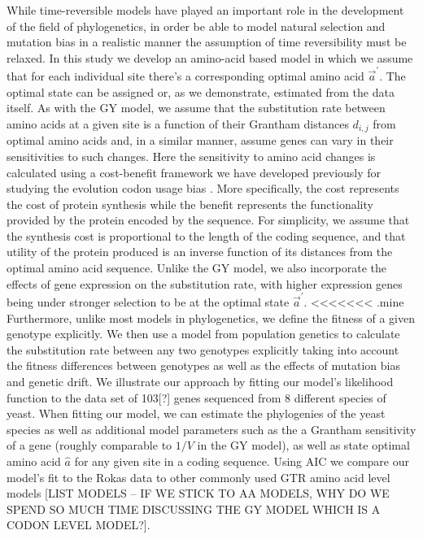 \documentclass[13pt]{article}
\newcommand{\avecopt}{\ensuremath{\vec{a}^\prime}\xspace}
\begin{document}
While time-reversible models have played an important role in the development of the field of phylogenetics,  in order be able to model natural selection and mutation bias in a realistic manner the assumption of time reversibility must be relaxed.
In this study we develop an amino-acid based model in which we assume that for each individual site there's a corresponding optimal amino acid $\avecopt$.
The optimal state can be assigned or, as we demonstrate, estimated from the data itself.
As with the GY model, we assume that the substitution rate between amino acids at a given site is a function of their Grantham distances $d_{i,j}$ from optimal amino acids and, in a similar manner, assume genes can vary in their sensitivities to such changes.
Here the sensitivity to amino acid changes is calculated using a cost-benefit framework we have developed previously for studying the evolution codon usage bias \cite{Gilchrist07, GilchristEtAl09,ShahAndGilchrist11}.
More specifically, the cost represents the cost of protein synthesis while the benefit represents the functionality provided by the protein encoded by the sequence.
For simplicity, we assume that the synthesis cost is proportional to the length of the coding sequence, and that utility of the protein produced is an inverse function of its distances from the optimal amino acid sequence.
Unlike the GY model, we also incorporate the effects of gene expression on the substitution rate, with higher expression genes being under stronger selection to be at the optimal state $\avecopt$.
<<<<<<< .mine
Furthermore, unlike most models in phylogenetics, we define the fitness of a given genotype explicitly.
We then use a model from population genetics to calculate the substitution rate between any two genotypes explicitly taking into account the fitness differences between genotypes as well as the effects of mutation bias and genetic drift.
We illustrate our approach by fitting our model's likelihood function to the \cite{RokasEtAl03} data set of 103[?] genes sequenced from 8 different species of yeast.
When fitting our model, we can estimate the phylogenies of the yeast species as well as additional model parameters such as the a Grantham sensitivity of a gene (roughly comparable to $1/V$ in the GY model), as well as state optimal amino acid $\hat{a}$ for any given site in a coding sequence.
Using AIC we compare our model's fit to the Rokas data to other commonly used GTR amino acid level models [LIST MODELS -- IF WE STICK TO AA MODELS, WHY DO WE SPEND SO MUCH TIME DISCUSSING THE GY MODEL WHICH IS A CODON LEVEL MODEL?].
\end{document}
